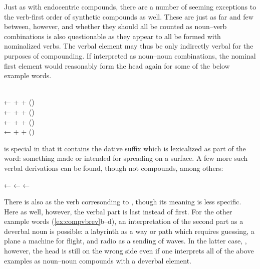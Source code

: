 Just as with endocentric compounds, there are a number of seeming exceptions to 
the verb-first order of synthetic compounds as well. These are just as far and 
few between, however, and whether they should all be counted as noun–verb 
combinations is also questionable as they appear to all be formed with 
nominalized verbs. The verbal element may thus be only indirectly verbal for the 
purposes of compounding. If interpreted as noun--noun combinations, the nominal 
first element would reasonably form the head again for some of the below example 
words.

\pex\label{ex:compvbrev}
	\a {} \\
		← 
		+ 
		+  (\Dat{})
	\a {} \\
		← 
		+ 
		+  (\Nmlz{})
	\a {} \\
		← 
		+ 
		+  (\Nmlz{})
	\a {} \\
		← 
		+ 
		+  (\Nmlz{})
\xe

 is special in that it contains the dative 
suffix  which is lexicalized as part of the word: something 
made or intended for spreading on a surface. A few more such verbal derivations 
can be found, though not compounds, among others:

\pex
	\a {}
		← 
	\a {}
		←  
	\a {}
		← 
\xe

There is also  as the verb corresonding 
to , though its meaning is less specific. Here 
as well, however, the verbal part is last instead of first. For the other 
example words (\ref{ex:compvbrev}b--d), an interpretation of the second part as 
a deverbal noun is possible: a labyrinth as a way or path which requires 
guessing, a plane a machine for flight, and radio as a sending of waves. In the 
latter case, , however, the head is still on the 
wrong side even if one interprets all of the above examples as noun--noun 
compounds with a deverbal element.

